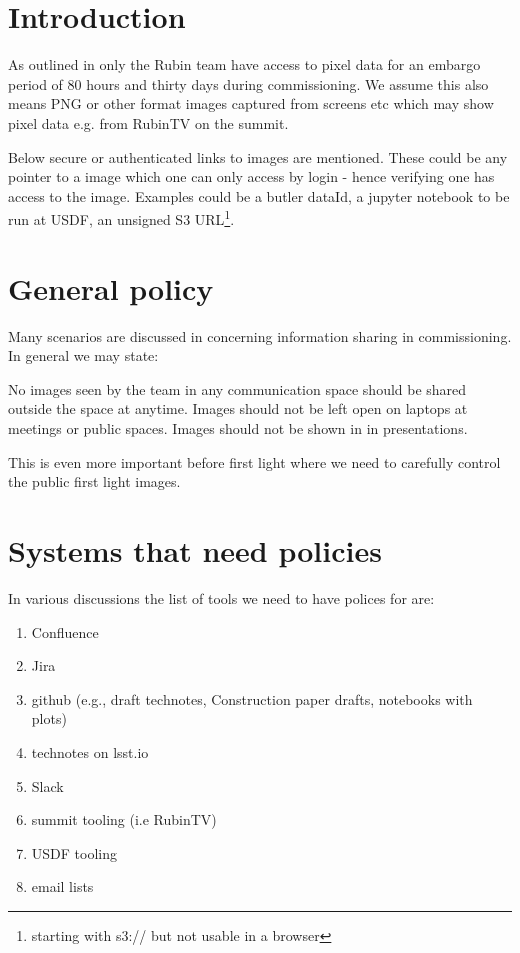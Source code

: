 
\section{Introduction}
As outlined in  only the Rubin team have access to pixel data for an embargo period of 80 hours and thirty days during commissioning. We assume this also means PNG or other format images captured from screens etc which may show pixel data e.g. from RubinTV on the summit.

Below secure or authenticated links to images are mentioned.
These could be any pointer to a image which one can only access by login - hence verifying one has access to the image. Examples could be a butler dataId, a jupyter notebook to be run at USDF, an unsigned S3 URL\footnote{starting with s3:// but not usable in a browser}.

\section{General policy} \label{sec:genpol}
Many scenarios are discussed in  concerning information sharing in commissioning.
In general we may state:

No images seen by the team in any communication space should be shared outside the space at anytime.
Images should not be left open on laptops at meetings or public spaces.
Images should not be shown in in presentations.


This is even more important before first light where we need to carefully control the public first light images.

\section {Systems that need policies}
In various discussions the list of tools we need to have polices for are:

\begin{enumerate}
    \item Confluence
    \item Jira
    \item github (e.g., draft technotes, Construction paper drafts, notebooks with plots)
    \item technotes on lsst.io
    \item Slack
    \item summit tooling (i.e RubinTV)
    \item USDF tooling
    \item email lists
\end{enumerate}

